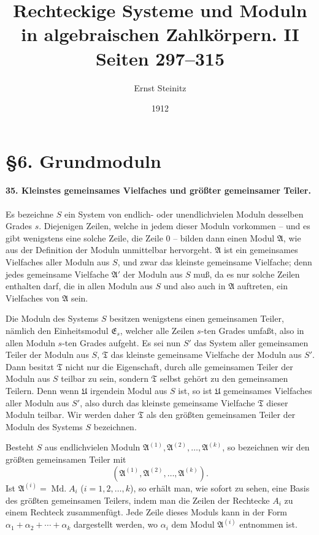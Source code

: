 \documentclass[11pt]{article}
\title{Rechteckige Systeme und Moduln in algebraischen Zahlkörpern. II\\\large Seiten 297--315}
\author{Ernst Steinitz}
\date{1912}
\newcommand{\Md}{\operatorname{Md.}}
\begin{document}
\maketitle

\section*{\S 6. Grundmoduln}

\paragraph{35. Kleinstes gemeinsames Vielfaches und größter gemeinsamer Teiler.}
Es bezeichne $S$ ein System von endlich- oder unendlichvielen Moduln desselben Grades $s$. Diejenigen Zeilen, welche in jedem dieser Moduln vorkommen -- und es gibt wenigstens eine solche Zeile, die Zeile $0$ -- bilden dann einen Modul $\mathfrak A$, wie aus der Definition der Moduln unmittelbar hervorgeht. $\mathfrak A$ ist ein gemeinsames Vielfaches aller Moduln aus $S$, und zwar das kleinste gemeinsame Vielfache; denn jedes gemeinsame Vielfache $\mathfrak A'$ der Moduln aus $S$ muß, da es nur solche Zeilen enthalten darf, die in allen Moduln aus $S$ und also auch in $\mathfrak A$ auftreten, ein Vielfaches von $\mathfrak A$ sein.

Die Moduln des Systems $S$ besitzen wenigstens einen gemeinsamen Teiler, nämlich den Einheitsmodul $\mathfrak E_s$, welcher alle Zeilen $s$-ten Grades umfaßt, also in allen Moduln $s$-ten Grades aufgeht. Es sei nun $S'$ das System aller gemeinsamen Teiler der Moduln aus $S$, $\mathfrak T$ das kleinste gemeinsame Vielfache der Moduln aus $S'$. Dann besitzt $\mathfrak T$ nicht nur die Eigenschaft, durch alle gemeinsamen Teiler der Moduln aus $S$ teilbar zu sein, sondern $\mathfrak T$ selbst gehört zu den gemeinsamen Teilern. Denn wenn $\mathfrak U$ irgendein Modul aus $S$ ist, so ist $\mathfrak U$ gemeinsames Vielfaches aller Moduln aus $S'$, also durch das kleinste gemeinsame Vielfache $\mathfrak T$ dieser Moduln teilbar. Wir werden daher $\mathfrak T$ als den größten gemeinsamen Teiler der Moduln des Systems $S$ bezeichnen.

Besteht $S$ aus endlichvielen Moduln $\mathfrak A^{(1)},\mathfrak A^{(2)},\ldots,\mathfrak A^{(k)}$, so bezeichnen wir den größten gemeinsamen Teiler mit
\[
(\mathfrak A^{(1)},\mathfrak A^{(2)},\ldots,\mathfrak A^{(k)}).
\]
Ist $\mathfrak A^{(i)}=\Md A_i$ ($i=1,2,\ldots,k$), so erhält man, wie sofort zu sehen, eine Basis des größten gemeinsamen Teilers, indem man die Zeilen der Rechtecke $A_i$ zu einem Rechteck zusammenfügt. Jede Zeile dieses Moduls kann in der Form $\alpha_1+\alpha_2+\cdots+\alpha_k$ dargestellt werden, wo $\alpha_i$ dem Modul $\mathfrak A^{(i)}$ entnommen ist.
\end{document}
